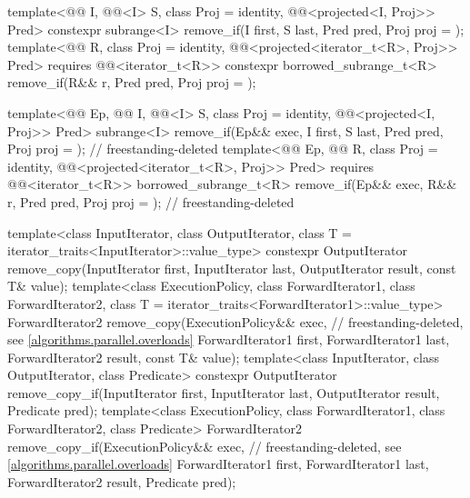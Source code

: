 \begin{codeblock}
{{    template<@@ I, @@<I> S, class Proj = identity,
             @@<projected<I, Proj>> Pred>
      constexpr subrange<I> remove_if(I first, S last, Pred pred, Proj proj = {});
    template<@@ R, class Proj = identity,
             @@<projected<iterator_t<R>, Proj>> Pred>
      requires @@<iterator_t<R>>
      constexpr borrowed_subrange_t<R>
        remove_if(R&& r, Pred pred, Proj proj = {});

    template<@@ Ep, @@ I, @@<I> S,
             class Proj = identity, @@<projected<I, Proj>> Pred>
      subrange<I>
        remove_if(Ep&& exec, I first, S last, Pred pred, Proj proj = {});   // freestanding-deleted
    template<@@ Ep, @@ R, class Proj = identity,
             @@<projected<iterator_t<R>, Proj>> Pred>
      requires @@<iterator_t<R>>
      borrowed_subrange_t<R>
        remove_if(Ep&& exec, R&& r, Pred pred, Proj proj = {});             // freestanding-deleted
  }

  template<class InputIterator, class OutputIterator,
           class T = iterator_traits<InputIterator>::value_type>
    constexpr OutputIterator
      remove_copy(InputIterator first, InputIterator last,
                  OutputIterator result, const T& value);
  template<class ExecutionPolicy, class ForwardIterator1, class ForwardIterator2,
           class T = iterator_traits<ForwardIterator1>::value_type>
    ForwardIterator2
      remove_copy(ExecutionPolicy&& exec,                       // freestanding-deleted, see \ref{algorithms.parallel.overloads}
                  ForwardIterator1 first, ForwardIterator1 last,
                  ForwardIterator2 result, const T& value);
  template<class InputIterator, class OutputIterator, class Predicate>
    constexpr OutputIterator
      remove_copy_if(InputIterator first, InputIterator last,
                     OutputIterator result, Predicate pred);
  template<class ExecutionPolicy, class ForwardIterator1, class ForwardIterator2,
           class Predicate>
    ForwardIterator2
      remove_copy_if(ExecutionPolicy&& exec,                    // freestanding-deleted, see \ref{algorithms.parallel.overloads}
                     ForwardIterator1 first, ForwardIterator1 last,
                     ForwardIterator2 result, Predicate pred);

}
\end{codeblock}
